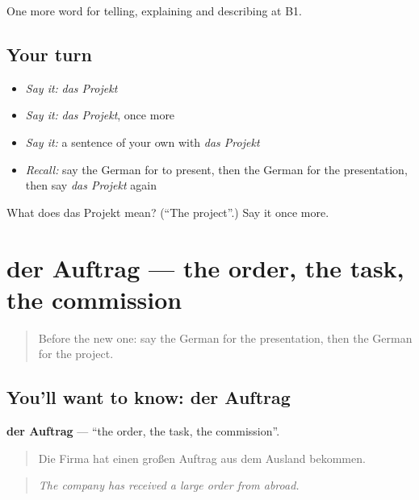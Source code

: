 \begin{grammarlens}[title={What you've built}]
One more word for telling, explaining and describing at B1.
\end{grammarlens}

\subsection*{Your turn}
\begin{itemize}
\raggedright
  \item \emph{Say it:} \emph{das Projekt}
  \item \emph{Say it:} \emph{das Projekt}, once more
  \item \emph{Say it:} a sentence of your own with \emph{das Projekt}
  \item \emph{Recall:} say the German for to present, then the German for the presentation, then say \emph{das Projekt} again
\end{itemize}

\begin{tcolorbox}[breakable,colback=teal!4,colframe=teal!35!black,title={Before you move on}]
What does das Projekt mean? (\textquotedblleft{}The project\textquotedblright{}.) Say it once more.
\end{tcolorbox}
\section[der Auftrag]{der Auftrag — the order, the task, the commission}

\label{lesson:GE-C355-auftrag}



\begin{quote}
Before the new one: say the German for the presentation, then the German for the project.
\end{quote}

\subsection*{You'll want to know: der Auftrag}
\textbf{der Auftrag} — \textquotedblleft{}the order, the task, the commission\textquotedblright{}.

\begin{quote}
Die Firma hat einen großen Auftrag aus dem Ausland bekommen.
\end{quote}

\begin{quote}
\emph{The company has received a large order from abroad.}
\end{quote}


